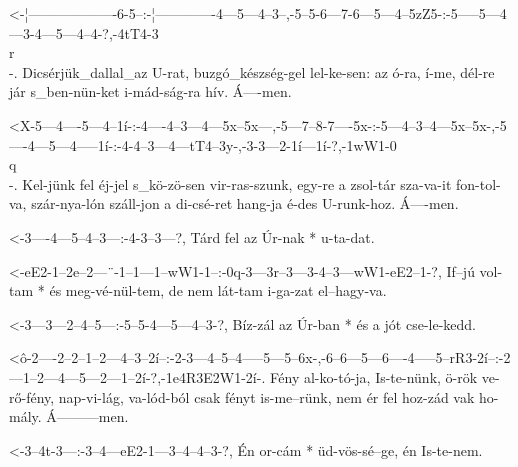   {<-¦-------------------6-5--:-¦-------------4---5---4--3--,-5--5-6---7-6---5---4--5zZ5-:-5-----5---4---3-4---5---4--4-?,-4tT4-3\\r\\-.}
  {  Dicsérjük_dallal_az U-rat, buzgó_készség-gel lel-ke-sen: az ó-ra, í-me, dél-re jár    s_ben-nün-ket i-mád-ság-ra hív. Á----men.}
  


  {<X-5---4----5---4--1í-:-4----4--3---4---5x--5x---,-5---7--8-7----5x-:-5---4--3--4---5x--5x-,-5----4---5---4-----1í-:-4-4--3---4---tT4--3y-,-3-3---2-1í---1í-?,-1wW1-0\\q\\-.}
  {   Kel-jünk fel éj-jel  s_kö-zö-sen vir-ras-szunk, egy-re a zsol-tár  sza-va-it fon-tol-va,  szár-nya-lón száll-jon  a di-csé-ret hang-ja   é-des U-runk-hoz.  Á----men.}

  {<-3----4---5--4--3---:-4-3--3---?,}
  {  Tárd fel az Úr-nak * u-ta-dat.}

  {<-eE2-1--2e--2---¨-1--1---1--wW1-1--:-0q-3---3r--3---3-4--3---wW1-eE2--1-?,}
  {  If--jú vol-tam * és meg-vé-nül-tem, de nem lát-tam i-ga-zat el--hagy-va.}

  {<-3---3---2--4--5---:-5--5-4---5---4--3-?,}
  {  Bíz-zál az Úr-ban * és a jót cse-le-kedd.}


  {<ô-2----2--2--1--2---4--3--2í--:-2-3---4--5--4-----5---5--6x-,-6--6---5---6----4-----5--rR3-2í--:-2---1--2---4---5---2---1--2í-?,-1e4R3E2W1-2í-.}
  {   Fény al-ko-tó-ja, Is-te-nünk, ö-rök ve-rő-fény, nap-vi-lág, va-lód-ból csak fényt is-me--rünk, nem ér fel hoz-zád vak ho-mály. Á---------men.}

  {<-3--4t-3---:-3--4---eE2-1---3--4--4--3-?,}
  {  Én or-cám * üd-vös-sé--ge, én Is-te-nem.}

